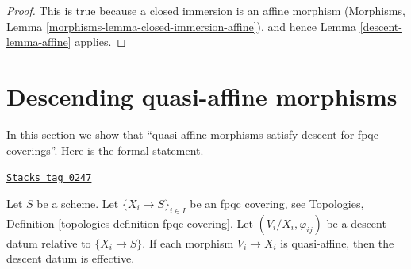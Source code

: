 \begin{proof}

This is true because a closed immersion is an affine morphism
(Morphisms, Lemma \ref{morphisms-lemma-closed-immersion-affine}),
and hence Lemma \ref{descent-lemma-affine} applies.
\end{proof}

\section{Descending quasi-affine morphisms}
\label{descent-section-quasi-affine}
In this section we show that
``quasi-affine morphisms satisfy descent for fpqc-coverings''.
Here is the formal statement.

\begin{lemma}
\label{descent-lemma-quasi-affine}
\href{https://stacks.math.columbia.edu/tag/0247}{\texttt{Stacks tag 0247}}

Let $S$ be a scheme.
Let $\{X_i \to S\}_{i\in I}$ be an fpqc covering, see
Topologies, Definition \ref{topologies-definition-fpqc-covering}.
Let $(V_i/X_i, \varphi_{ij})$ be a descent datum
relative to $\{X_i \to S\}$. If each morphism
$V_i \to X_i$ is quasi-affine, then the descent datum is
effective.
\end{lemma}

